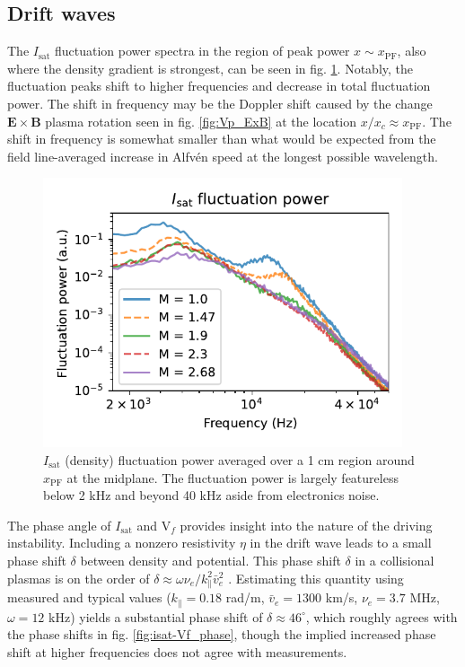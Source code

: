 \subsection{Drift waves}
The $I_\text{sat}$ fluctuation power spectra in the region of peak power $x \sim x_\text{PF}$, also where the density gradient is strongest, can be seen in fig. \ref{fig:isat_fluct_power}. Notably, the fluctuation peaks shift to higher frequencies and decrease in total fluctuation power. The shift in frequency may be the Doppler shift caused by the change $\boldsymbol{E \times B}$ plasma rotation seen in fig. \ref{fig:Vp_ExB} at the location $x/x_c \approx x_\text{PF}$. The shift in frequency is somewhat smaller than what would be expected from the field line-averaged increase in Alfv\'en speed at the longest possible wavelength.
\begin{figure}
    \centering
    \includegraphics[width=300pt]{figures/fig10.pdf}
    \caption[$I_\text{sat}$ (density) fluctuation power]{$I_\text{sat}$ (density) fluctuation power averaged over a 1 cm region around $x_\text{PF}$ at the midplane. The fluctuation power is largely featureless below 2 kHz and beyond 40 kHz aside from electronics noise.}
    \label{fig:isat_fluct_power}
\end{figure}
The phase angle of $I_\text{sat}$ and V$_f$ provides insight into the nature of the driving instability. Including a nonzero resistivity $\eta$ in the drift wave leads to a small phase shift $\delta$ between density and potential.
This phase shift $\delta$ in a collisional plasmas is on the order of $\delta \approx \omega \nu_e / k_\parallel^2 \bar{v}_e^2$ \cite{Horton_1999}. Estimating this quantity using measured and typical values ($k_\parallel = 0.18$ rad/m, $\bar{v}_e = 1300$ km/s, $\nu_e = 3.7$ MHz, $\omega = 12$ kHz) yields a substantial phase shift of $\delta \approx 46^\circ$, which roughly agrees with the phase shifts in fig. \ref{fig:isat-Vf_phase}, though the implied increased phase shift at higher frequencies does not agree with measurements.
